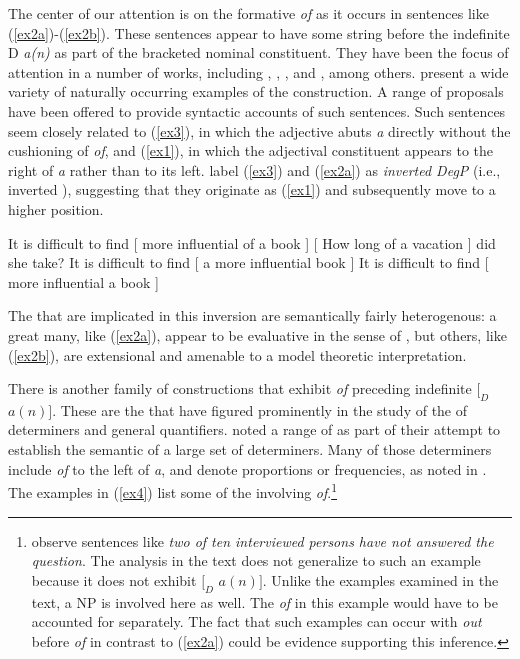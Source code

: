 \documentclass[output=paper,
modfonts
]{LSP/langsci}
\begin{document}
The center of our attention is on the formative {\textit{of}} as it occurs in sentences like ({\ref{ex2a}})-({\ref{ex2b}}).  These sentences appear to have some string  before the indefinite D {\textit{a(n)}} as part of the bracketed nominal constituent.  They have been the focus of attention in a number of works, including {\citet{Bolinger72}}, {\citet{Bresnan73}}, {\citet{Hendrick90}}, and {\citet{Kennedy00}}, among others.  {\citet{Kim11}} present a wide variety of naturally occurring examples of the construction.  A range of proposals have been offered to provide syntactic accounts of such sentences.  Such sentences seem closely related to ({\ref{ex3}}), in which the adjective abuts {\textit{a}} directly without the cushioning of {\textit{of}}, and ({\ref{ex1}}), in which the adjectival constituent appears to the right of {\textit{a}} rather than to its left.  {\citet{Kennedy00}} label ({\ref{ex3}}) and ({\ref{ex2a}}) as {\textit{inverted DegP}} (i.e., inverted ), suggesting that they originate as ({\ref{ex1}})  and subsequently move to a higher position.

\begin{exe}
\ex \label{ex2a}  It is difficult to find [ more influential of a book ]
\ex \label{ex2b}  [ How long of a vacation ] did she take?
\ex \label{ex1}  It is difficult to find [ a more influential book ]
\ex \label{ex3}  It is difficult to find [ more influential a book ]
\end{exe}

The  that are implicated in this inversion are semantically fairly heterogenous:  a great many, like ({\ref{ex2a}}), appear to be evaluative in the sense of {\citet{Keenan85}}, but others, like ({\ref{ex2b}}), are extensional and amenable to a model theoretic interpretation.

There is another family of constructions that exhibit {\textit{of}} preceding indefinite $ [_{D}$ $a(n) ]$.  These are the  that have figured prominently in the study of the  of determiners and general quantifiers.  {\citet{Keenan86}} noted a range of  as part of their attempt to establish the semantic  of a large set of determiners.  Many of those determiners include {\textit{of}} to the left of {\textit{a}}, and denote proportions or frequencies, as noted in {\citet{Peters06}}.  The examples in ({\ref{ex4}}) list some of the  involving {\textit{of}}.{\footnote{ {\citet{Peters06}} observe sentences like {\textit{two of ten interviewed persons have not answered the question}}.  The analysis in the text does not generalize to such an example because it does not exhibit $[_{D}$ $a(n) ]$.  Unlike the examples examined in the text, a  NP is involved here as well.   The {\textit{of}} in this example would have to be accounted for separately.  The fact that such examples can occur with {\textit{out}} before {\textit{of}} in contrast to ({\ref{ex2a}}) could be evidence supporting this inference.} }
\end{document}
